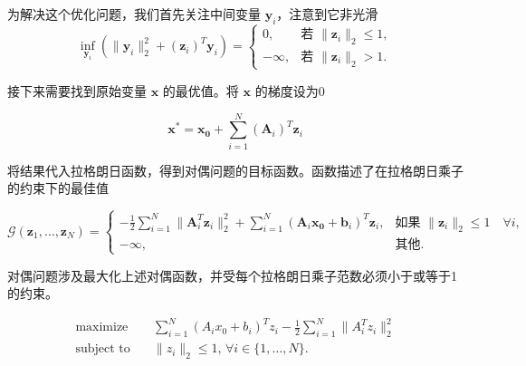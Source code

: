 \documentclass{article}
\begin{document}
为解决这个优化问题，我们首先关注中间变量 $\mathbf{y}_i$，注意到它非光滑
\begin{equation}
    \inf_{\mathbf{y}_i} \left( \|\mathbf{y}_i\|_2^2 + (\mathbf{z}_i)^T\mathbf{y}_i \right) =
    \begin{cases}
        0,       & \text{若 } \|\mathbf{z}_i\|_2 \leq 1, \\
        -\infty, & \text{若 } \|\mathbf{z}_i\|_2 > 1.
    \end{cases}
\end{equation}

接下来需要找到原始变量 $\mathbf{x}$ 的最优值。将 $\mathbf{x}$ 的梯度设为0

\begin{equation}
    \mathbf{x}^* = \mathbf{x_0} + \sum_{i=1}^{N} (\mathbf{A}_i)^T \mathbf{z}_i
\end{equation}

将结果代入拉格朗日函数，得到对偶问题的目标函数。函数描述了在拉格朗日乘子的约束下的最佳值

\begin{equation}
    \mathcal{G}(\mathbf{z}_1, \ldots, \mathbf{z}_N) =
    \begin{cases}
        -\frac{1}{2} \sum_{i=1}^{N} \|\mathbf{A}_i^T \mathbf{z}_i \|_2^2 + \sum_{i=1}^{N} (\mathbf{A}_i \mathbf{x_0} + \mathbf{b}_i)^T \mathbf{z}_i, & \text{如果 } \|\mathbf{z}_i\|_2 \leq 1 \quad \forall i, \\
        -\infty,                                                                                                                                     & \text{其他}.
    \end{cases}
\end{equation}

对偶问题涉及最大化上述对偶函数，并受每个拉格朗日乘子范数必须小于或等于1的约束。

\begin{align}
    \text{maximize} \quad   & \sum_{i=1}^{N} (A_i x_0 + b_i)^T z_i - \frac{1}{2} \sum_{i=1}^{N} \| A_i^T z_i \|_2^2 \\
    \text{subject to} \quad & \|z_i\|_2 \leq 1, \, \forall i \in \{1, \ldots, N\}.
\end{align}
\end{document}
